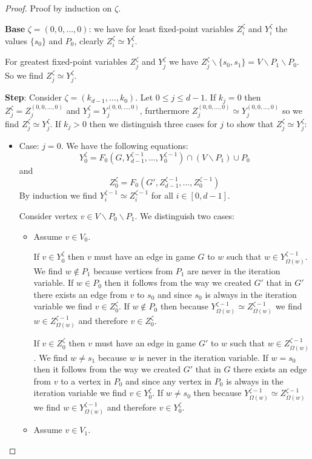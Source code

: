 \begin{theorem}
\begin{proof}
		Proof by induction on $\zeta$.
		
		\textbf{Base} $\zeta = (0,0,\dots,0)$: we have for least fixed-point variables $Z_i^\zeta$ and $Y_i^{\zeta}$ the values $\{s_0\}$ and $P_0$, clearly $Z_i^\zeta \simeq Y_i^{\zeta}$. 
		
		For greatest fixed-point variables $Z_j^\zeta$ and $Y_j^{\zeta}$ we have $Z_j^\zeta \backslash \{s_0,s_1\} = V \backslash P_1 \backslash P_0$. So we find $Z_j^\zeta \simeq Y_j^{\zeta}$.
		
		\textbf{Step}: Consider $\zeta = (k_{d-1},\dots,k_0)$. Let $0 \leq j \leq d-1$. If $k_j = 0$ then $Z_j^\zeta = Z_j^{(0,0,\dots,0)}$ and $Y_j^{\zeta} = Y_j^{(0,0,\dots,0)}$, furthermore $Z_j^{(0,0,\dots,0)}\simeq Y_j^{(0,0,\dots,0)}$ so we find $Z_j^{\zeta} \simeq Y_j^{\zeta}$.
		If $k_j > 0$ then we distinguish three cases for $j$ to show that $Z_j^{\zeta} \simeq Y_j^{\zeta}$:
		\begin{itemize}
			\item Case: $j=0$. We have the following equations:
			\[ Y_0^{\zeta} = F_0(G,Y_{d-1}^{\zeta-1},\dots,Y_0^{\zeta-1}) \cap (V\backslash P_1) \cup P_0 \]
			and
			\[ Z_0^{\zeta} = F_0(G',Z_{d-1}^{\zeta-1},\dots,Z_0^{\zeta-1}) \]
			By induction we find $Y_i^{\zeta-1} \simeq Z_i^{\zeta-1}$ for all $i \in [0,d-1]$.
			
			
			Consider vertex $v \in V\backslash P_0 \backslash P_1$. We distinguish two cases:
			\begin{itemize}
				\item Assume $v \in V_0$.
				
				If $v \in Y_0^{\zeta}$ then $v$ must have an edge in game $G$ to $w$ such that $w\in Y^{\zeta-1}_{\Omega(w)}$. We find $w \notin P_1$ because vertices from $P_1$ are never in the iteration variable. If $w \in P_0$ then it follows from the way we created $G'$ that in $G'$ there exists an edge from $v$ to $s_0$ and since $s_0$ is always in the iteration variable we find $v \in Z_0^{\zeta}$. If $w \notin P_0$ then because $Y^{\zeta-1}_{\Omega(w)} \simeq Z^{\zeta-1}_{\Omega(w)}$ we find $w \in Z^{\zeta-1}_{\Omega(w)}$ and therefore $v \in Z_0^{\zeta}$.
				
				If $v \in Z_0^{\zeta}$ then $v$ must have an edge in game $G'$ to $w$ such that $w\in Z^{\zeta-1}_{\Omega(w)}$. We find $w \neq s_1$ because $w$ is never in the iteration variable. If $w = s_0$ then it follows from the way we created $G'$ that in $G$ there exists an edge from $v$ to a vertex in $P_0$ and since any vertex in $P_0$ is always in the iteration variable we find $v \in Y_0^{\zeta}$. If $w \neq s_0$ then because $Y^{\zeta-1}_{\Omega(w)} \simeq Z^{\zeta-1}_{\Omega(w)}$ we find $w \in Y^{\zeta-1}_{\Omega(w)}$ and therefore $v \in Y_0^{\zeta}$.
				\item Assume $v \in V_1$.
				

\end{itemize}
\end{itemize}
\end{proof}
\end{theorem}
